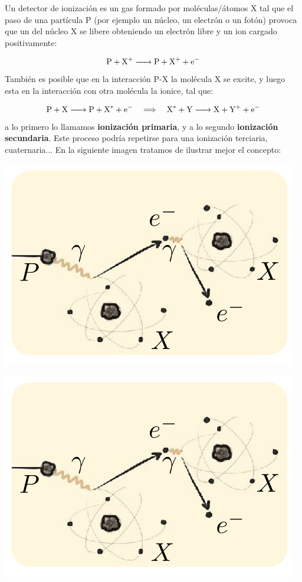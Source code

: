 Un detector de ionización es un gas formado por moléculas/átomos X tal que el paso de una partícula P (por ejemplo un núcleo, un electrón o un fotón) provoca que un del núcleo X se libere obteniendo un electrón libre y un ion cargado positivamente:

\[ \ce{P + X+ -> P +  X+ + e-} \]
También es posible que en la interacción P-X la molécula X se excite, y luego esta en la interacción con otra molécula la ionice, tal que: 

\[ \ce{P + X -> P +  X^* + e-} \quad \Longrightarrow \quad  \ce{X^* + Y -> X + Y^+ + e-}  \]
a lo primero lo llamamos \textbf{ionización primaria}, y a lo segundo \textbf{ionización secundaria}. Este proceso podría repetirse para una ionización terciaria, cuaternaria... En la siguiente imagen tratamos de ilustrar mejor el concepto: 

\begin{minipage}{0.45\linewidth} \centering
    \includegraphics[width=0.9\linewidth]{Cuerpo/Ch_01/Detectores_01.png}
\end{minipage}
\hfill
\begin{minipage}{0.45\linewidth} \centering
    \includegraphics[width=0.9\linewidth]{Cuerpo/Ch_01/Detectores_01.png}
\end{minipage}




